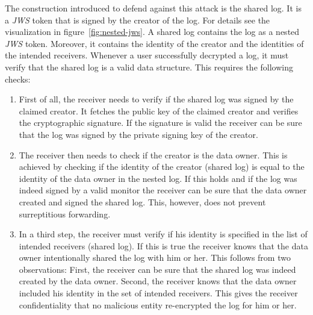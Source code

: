 \documentclass[../main.tex]{subfiles}
\begin{document}
The construction introduced to defend against this attack is the shared log.
It is a \emph{JWS} token that is signed by the creator of the log.
For details see the visualization in figure~\ref{fig:nested-jws}.
A shared log contains the log as a nested \emph{JWS} token.
Moreover, it contains the identity of the creator and the identities of the intended receivers.
Whenever a user successfully decrypted a log, it must verify that the shared log is a valid data structure.
This requires the following checks:
\begin{enumerate}
\item 
First of all, the receiver needs to verify if the shared log was signed by the claimed creator.
It fetches the public key of the claimed creator and verifies the cryptographic signature.
If the signature is valid the receiver can be sure that the log was signed by the private signing key of the creator.
\item 
The receiver then needs to check if the creator is the data owner. 
This is achieved by checking if the identity of the creator (shared log) is equal to the identity of the data owner in the nested log.
If this holds and if the log was indeed signed by a valid monitor the receiver can be sure that the data owner created and signed the shared log.
This, however, does not prevent surreptitious forwarding.
\item 
In a third step, the receiver must verify if his identity is specified in the list of intended receivers (shared log).
If this is true the receiver knows that the data owner intentionally shared the log with him or her.
This follows from two observations:
First, the receiver can be sure that the shared log was indeed created by the data owner.
Second, the receiver knows that the data owner included his identity in the set of intended receivers.
This gives the receiver confidentiality that no malicious entity re-encrypted the log for him or her.
\end{enumerate}
\end{document}
